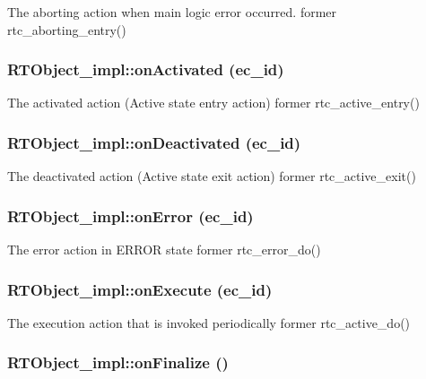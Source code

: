 The aborting action when main logic error occurred. former rtc\_\-aborting\_\-entry()
\subsubsection{\setlength{\rightskip}{0pt plus 5cm}RTObject\_\-impl::on\-Activated (ec\_\-id)}\label{classRTObject__impl_RTObject__impla5}


The activated action (Active state entry action) former rtc\_\-active\_\-entry()
\subsubsection{\setlength{\rightskip}{0pt plus 5cm}RTObject\_\-impl::on\-Deactivated (ec\_\-id)}\label{classRTObject__impl_RTObject__impla6}


The deactivated action (Active state exit action) former rtc\_\-active\_\-exit()
\subsubsection{\setlength{\rightskip}{0pt plus 5cm}RTObject\_\-impl::on\-Error (ec\_\-id)}\label{classRTObject__impl_RTObject__impla9}


The error action in ERROR state former rtc\_\-error\_\-do()
\subsubsection{\setlength{\rightskip}{0pt plus 5cm}RTObject\_\-impl::on\-Execute (ec\_\-id)}\label{classRTObject__impl_RTObject__impla7}


The execution action that is invoked periodically former rtc\_\-active\_\-do()
\subsubsection{\setlength{\rightskip}{0pt plus 5cm}RTObject\_\-impl::on\-Finalize ()}\label{classRTObject__impl_RTObject__impla2}


